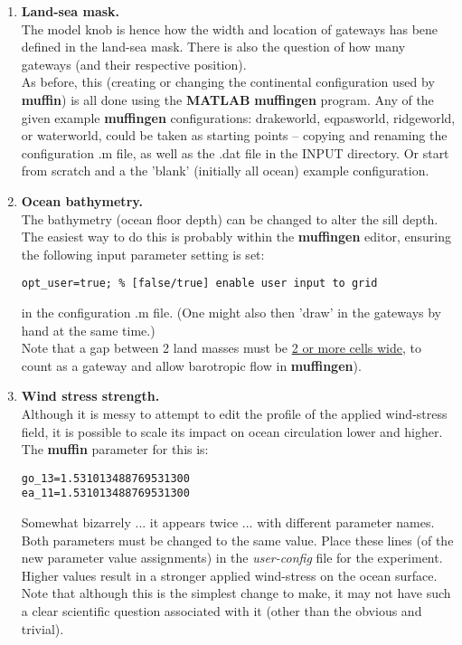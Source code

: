 \documentclass[11pt,fleqn]{book} %
\begin{document}
\vspace{2mm}
\begin{enumerate}
\vspace{1mm}
\item \textbf{Land-sea mask.}
\\The model knob is hence how the width and location of gateways has bene defined in the land-sea mask. There is also the question of how many gateways (and their respective position).
\\As before, this (creating or changing the continental configuration used by \textbf{muffin}) is all done using the \textbf{MATLAB} \textbf{muffingen} program. Any of the given example \textbf{muffingen} configurations: \textsf{drakeworld}, \textsf{eqpasworld}, \textsf{ridgeworld}, or \textsf{waterworld}, could be taken as starting points -- copying and renaming the configuration \textsf{.m} file, as well as the \textsf{.dat} file in the \textsf{INPUT} directory.
Or start from scratch and a the 'blank' (initially all ocean) example configuration.\vspace{1mm}
\item \textbf{Ocean bathymetry.}
\\The bathymetry (ocean floor depth) can be changed to alter the sill depth. The easiest way to do this is probably within the \textbf{muffingen} editor, ensuring the following input parameter setting is set:
\vspace{-2pt}\begin{verbatim}
opt_user=true; % [false/true] enable user input to grid
\end{verbatim}\vspace{-2pt}
in the configuration \textsf{.m} file. (One might also then 'draw' in the gateways by hand at the same time.)
\\Note that a gap between 2 land masses must be \uline{2 or more cells wide}, to count as a gateway and allow barotropic flow in \textbf{muffingen}).
\vspace{1mm}
\item \textbf{Wind stress strength.}
\\Although it is messy to attempt to edit the profile of the applied wind-stress field, it is possible to scale its impact on ocean circulation lower and higher. The \textbf{muffin} parameter for this is:
\vspace{-2pt}\begin{verbatim}
go_13=1.531013488769531300
ea_11=1.531013488769531300
\end{verbatim}\vspace{-2pt}
Somewhat bizarrely ... it appears twice ... with different parameter names. Both parameters must be changed to the same value. Place these lines (of the new parameter value assignments) in the \textit{user-config} file for the experiment. Higher values result in a stronger applied wind-stress on the ocean surface.
\\Note that although this is the simplest change to make, it may not have such a clear scientific question associated with it (other than the obvious and trivial).
\end{enumerate}
\vspace{2mm}
\end{document}
